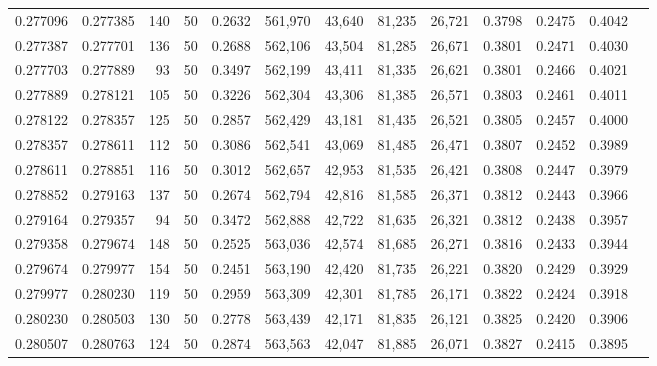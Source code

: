 \begin{tabular}{rrrrrrrrrrrrr}
0.277096 & 0.277385 &   140 &  50 &                                     0.2632 & 561,970 &  43,640 &  81,235 &  26,721 & 0.3798 & 0.2475 & 0.4042 \\
0.277387 & 0.277701 &   136 &  50 &                                     0.2688 & 562,106 &  43,504 &  81,285 &  26,671 & 0.3801 & 0.2471 & 0.4030 \\
0.277703 & 0.277889 &    93 &  50 &                                     0.3497 & 562,199 &  43,411 &  81,335 &  26,621 & 0.3801 & 0.2466 & 0.4021 \\
0.277889 & 0.278121 &   105 &  50 &                                     0.3226 & 562,304 &  43,306 &  81,385 &  26,571 & 0.3803 & 0.2461 & 0.4011 \\
0.278122 & 0.278357 &   125 &  50 &                                     0.2857 & 562,429 &  43,181 &  81,435 &  26,521 & 0.3805 & 0.2457 & 0.4000 \\
0.278357 & 0.278611 &   112 &  50 &                                     0.3086 & 562,541 &  43,069 &  81,485 &  26,471 & 0.3807 & 0.2452 & 0.3989 \\
0.278611 & 0.278851 &   116 &  50 &                                     0.3012 & 562,657 &  42,953 &  81,535 &  26,421 & 0.3808 & 0.2447 & 0.3979 \\
0.278852 & 0.279163 &   137 &  50 &                                     0.2674 & 562,794 &  42,816 &  81,585 &  26,371 & 0.3812 & 0.2443 & 0.3966 \\
0.279164 & 0.279357 &    94 &  50 &                                     0.3472 & 562,888 &  42,722 &  81,635 &  26,321 & 0.3812 & 0.2438 & 0.3957 \\
0.279358 & 0.279674 &   148 &  50 &                                     0.2525 & 563,036 &  42,574 &  81,685 &  26,271 & 0.3816 & 0.2433 & 0.3944 \\
0.279674 & 0.279977 &   154 &  50 &                                     0.2451 & 563,190 &  42,420 &  81,735 &  26,221 & 0.3820 & 0.2429 & 0.3929 \\
0.279977 & 0.280230 &   119 &  50 &                                     0.2959 & 563,309 &  42,301 &  81,785 &  26,171 & 0.3822 & 0.2424 & 0.3918 \\
0.280230 & 0.280503 &   130 &  50 &                                     0.2778 & 563,439 &  42,171 &  81,835 &  26,121 & 0.3825 & 0.2420 & 0.3906 \\
0.280507 & 0.280763 &   124 &  50 &                                     0.2874 & 563,563 &  42,047 &  81,885 &  26,071 & 0.3827 & 0.2415 & 0.3895 \\

\end{tabular}
